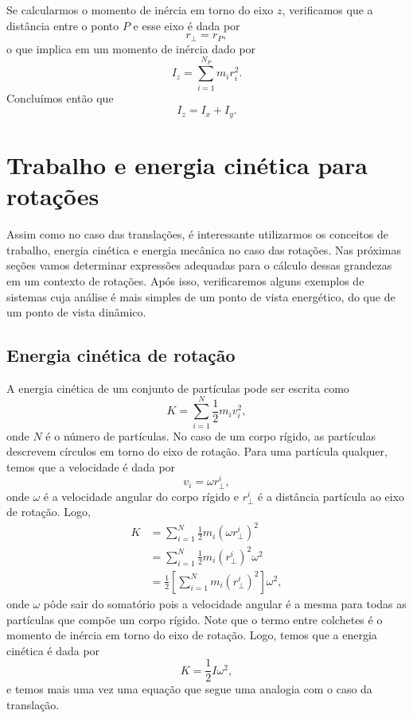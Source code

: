 Se calcularmos o momento de inércia em torno do eixo $z$, verificamos que a distância entre o ponto $P$ e esse eixo é dada por
\begin{equation}
    r_\perp = r_P,
\end{equation}
%
o que implica em um momento de inércia dado por
\begin{equation}
    I_z = \sum_{i = 1}^{N_P} m_i r_i^2.
\end{equation}
%
Concluímos então que
\begin{equation}
    I_z = I_x + I_y.
\end{equation}

\section{Trabalho e energia cinética para rotações}

Assim como no caso das translações, é interessante utilizarmos os conceitos de trabalho, energia cinética e energia mecânica no caso das rotações. Nas próximas seções vamos determinar expressões adequadas para o cálculo dessas grandezas em um contexto de rotações. Após isso, verificaremos alguns exemplos de sistemas cuja análise é mais simples de um ponto de vista energético, do que de um ponto de vista dinâmico.

\subsection{Energia cinética de rotação}

A energia cinética de um conjunto de partículas pode ser escrita como
\begin{equation}
	K = \sum_{i=1}^N \frac{1}{2} m_i v_i^2,
\end{equation}
%
onde $N$ é o número de partículas. No caso de um corpo rígido, as partículas descrevem círculos em torno do eixo de rotação. Para uma partícula qualquer, temos que a velocidade é dada por
\begin{equation}
    v_i = \omega r_\perp^i,
\end{equation}
%
onde $\omega$ é a velocidade angular do corpo rígido e $r_\perp^i$ é a distância  partícula ao eixo de rotação. Logo,
\begin{align}
	K &= \sum_{i=1}^{N} \frac{1}{2} m_i (\omega r_\perp^i)^2 \\
	&= \sum_{i=1}^N \frac{1}{2} m_i (r_\perp^i)^2 \omega^2 \\
	&= \frac{1}{2} \left[\sum_{i=1}^N m_i (r_\perp^i)^2\right] \omega^2,
\end{align}
%
onde $\omega$ pôde sair do somatório pois a velocidade angular é a mesma para todas as partículas que compõe um corpo rígido. Note que o termo entre colchetes é o momento de inércia em torno do eixo de rotação. Logo, temos que a energia cinética é dada por
\begin{equation}
	K = \frac{1}{2} I \omega^2,
\end{equation}
%
e temos mais uma vez uma equação que segue uma analogia com o caso da translação.

